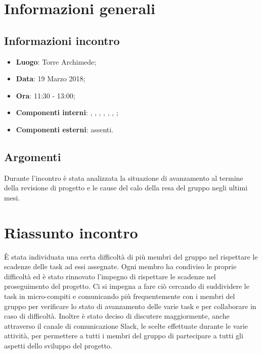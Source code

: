\section{Informazioni generali}
\subsection{Informazioni incontro}
\begin{itemize}
\item \textbf{Luogo}: Torre Archimede;
\item \textbf{Data}: 19 Marzo 2018;
\item \textbf{Ora}: 11:30 - 13:00;
\item \textbf{Componenti interni}: \Tommaso, \Carlo, \Isacco, \Mattia, \Luca, \Cristian, \Leonardo;
\item \textbf{Componenti esterni}: assenti.
\end{itemize}

\subsection{Argomenti}
Durante l'incontro è stata analizzata la situazione di avanzamento al termine della revisione di progetto e le cause del calo della resa del gruppo negli ultimi mesi.

\section{Riassunto incontro}
È stata individuata una certa difficoltà di più membri del gruppo nel rispettare le scadenze delle task ad essi assegnate. Ogni membro ha condiviso le proprie difficoltà ed è stato rinnovato l'impegno di rispettare le scadenze nel proseguimento del progetto. Ci si impegna a fare ciò cercando di suddividere le task in micro-compiti e comunicando più frequentemente con i membri del gruppo per verificare lo stato di avanzamento delle varie task e per collaborare in caso di difficoltà. Inoltre è stato deciso di discutere maggiormente, anche attraverso il canale di comunicazione Slack, le scelte effettuate durante le varie attività, per permettere a tutti i membri del gruppo di partecipare a tutti gli aspetti dello sviluppo del progetto.

